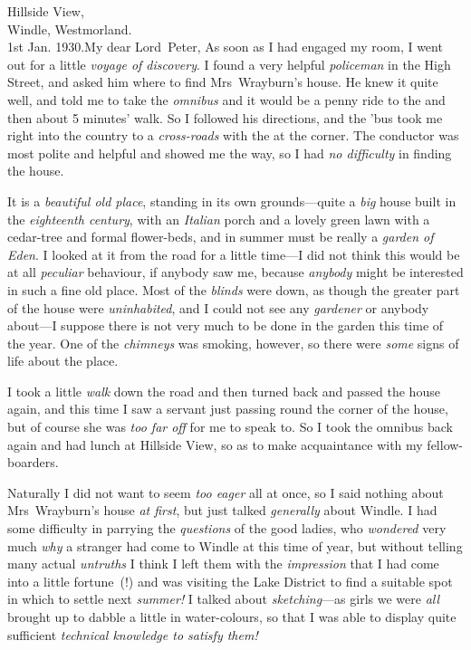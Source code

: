 \begin{mail}{Hillside View,\\Windle, Westmorland.\\1st Jan. 1930.}{My dear Lord~Peter,}
As soon as I had engaged my room, I went out for a little \emph{voyage of discovery}. I found a very helpful \emph{policeman} in the High Street, and asked him where to find Mrs~Wrayburn's house. He knew it quite well, and told me to take the \emph{omnibus} and it would be a penny ride to the  and then about 5 minutes' walk. So I followed his directions, and the 'bus took me right into the country to a \emph{cross-roads} with the  at the corner. The conductor was most polite and helpful and showed me the way, so I had \emph{no difficulty} in finding the house.

It is a \emph{beautiful old place}, standing in its own grounds—quite a \emph{big} house built in the \emph{eighteenth century}, with an \emph{Italian} porch and a lovely green lawn with a cedar-tree and formal flower-beds, and in summer must be really a \emph{garden of Eden}. I looked at it from the road for a little time—I did not think this would be at all \emph{peculiar} behaviour, if anybody saw me, because \emph{anybody} might be interested in such a fine old place. Most of the \emph{blinds} were down, as though the greater part of the house were \emph{uninhabited}, and I could not see any \emph{gardener} or anybody about—I suppose there is not very much to be done in the garden this time of the year. One of the \emph{chimneys} was smoking, however, so there were \emph{some} signs of life about the place.

I took a little \emph{walk} down the road and then turned back and passed the house again, and this time I saw a servant just passing round the corner of the house, but of course she was \emph{too far off} for me to speak to. So I took the omnibus back again and had lunch at Hillside View, so as to make acquaintance with my fellow-boarders.

Naturally I did not want to seem \emph{too eager} all at once, so I said nothing about Mrs~Wrayburn's house \emph{at first}, but just talked \emph{generally} about Windle. I had some difficulty in parrying the \emph{questions} of the good ladies, who \emph{wondered} very much \emph{why} a stranger had come to Windle at this time of year, but without telling many actual \emph{untruths} I think I left them with the \emph{impression} that I had come into a little fortune~(!) and was visiting the Lake District to find a suitable spot in which to settle next \emph{summer!} I talked about \emph{sketching}—as girls we were \emph{all} brought up to dabble a little in water-colours, so that I was able to display quite sufficient \emph{technical knowledge to satisfy them!}


\end{mail}
